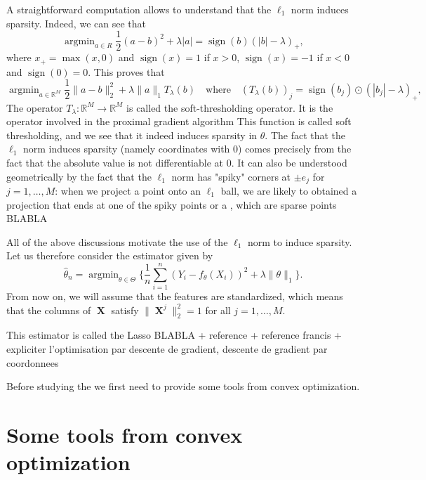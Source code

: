 \documentclass[
	fontsize=11pt, %
	twoside=false, %
	numbers=noenddot, %
]{kaobook}
\DeclareMathOperator{\bX}{{\boldsymbol X}}
\DeclareMathOperator*{\argmin}{argmin}
\newcommand{\R}{\mathbb R}
\newcommand{\wh}{\widehat}
\newcommand{\norm}[1]{\| #1 \|}
\DeclareMathOperator{\sign}{sign}
\begin{document}
A straightforward computation allows to understand that the $\ell_1$ norm induces sparsity.
Indeed, we can see that%
\begin{equation}
	\label{eq:soft-thresholding1}
	\argmin_{a \in R} \frac12 (a - b)^2 + \lambda |a| 
	= \sign(b) (|b| - \lambda)_+,
\end{equation}
where $x_+ = \max(x, 0)$ and $\sign(x) = 1$ if $x > 0$, $\sign(x) = -1$ if $x < 0$ and $\sign(0) = 0$.
This proves that%
\begin{equation}
	\label{eq:soft-thresholding2}
	\argmin_{a \in \R^M} \frac12 \norm{a - b}_2^2 + \lambda \norm{a}_1 
	T_\lambda(b) \quad \text{where} \quad 
	(T_\lambda(b))_j = \sign(b_j) \odot (|b_j| - \lambda)_+,
\end{equation}
The operator $T_\lambda : \R^M \rightarrow \R^M$ is called the soft-thresholding operator.
It is the operator involved in the proximal gradient algorithm
This function is called soft thresholding, and we see that it indeed induces sparsity in $\theta$.
The fact that the $\ell_1$ norm induces sparsity (namely coordinates with 0) comes precisely from the fact that the absolute value is not differentiable at $0$.
It can also be understood geometrically by the fact that the $\ell_1$ norm has "spiky" corners at $\pm e_j$ for $j=1, \ldots, M$: when we project a point onto an $\ell_1$ ball, we are likely to obtained a projection that ends at one of the spiky points or a , which are sparse points  BLABLA

All of the above discussions motivate the use of the $\ell_1$ norm to induce sparsity.
Let us therefore consider the estimator given by
\begin{equation}
	\label{eq:lasso-def2}
	\wh \theta_n = \argmin_{\theta \in \Theta} \Big\{ 
	\frac 1n \sum_{i=1}^n (Y_i - f_\theta(X_i))^2 
	+ \lambda \norm{\theta}_1 
	\Big\}.
\end{equation}
From now on, we will assume that the features are standardized, which means that the columns of $\bX$ satisfy $\norm{\bX^j}_2^2 = 1$ for all $j=1, \ldots, M$.

This estimator is called the Lasso BLABLA + reference + reference francis + expliciter l'optimisation par descente de gradient, descente de gradient par coordonnees

Before studying the we first need to provide some tools from convex optimization.

\section{Some tools from convex optimization} %
\label{sec:some_tools_from_convex_optimization}
\end{document}
